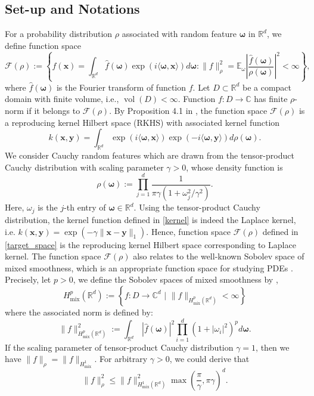 \documentclass[11pt,twoside]{article}
\theoremstyle{plain}
\theoremstyle{definition}
\theoremstyle{remark}
\newcommand{\R}{\mathbb{R}}
\newcommand{\C}{\mathbb{C}}
\newcommand{\E}{\mathbb{E}}
\newcommand{\xb}{\mathbf{x}}
\newcommand{\yb}{\mathbf{y}}
\newcommand{\Fc}{\mathcal{F}}
\newcommand{\vol}{\mathop{\mathrm{vol}}}
\newcommand{\omegab}{\boldsymbol\omega}
\begin{document}
\subsection{Set-up and Notations}
For a probability distribution $\rho$ associated with random feature $\omegab$ in $\R^d$, we define function space 
\begin{equation}
\label{target_space}
\Fc(\rho) := \left\{ f(\xb) = \int_{\R^d} \hat{f}(\omegab)\exp(i\langle \omegab, \xb\rangle)d\omegab : \|f\|^2_\rho = \E_\omega \left|\frac{\hat{f}(\omegab)}{\rho(\omegab)} \right|^2 <\infty \right\},
\end{equation}
where $\hat{f}(\omegab)$ is the Fourier transform of function $f$. Let $D\subset\R^d$ be a compact domain with finite volume, i.e., $\vol(D)<\infty$. 
Function $f:D\to\C$ has finite $\rho$-norm if it belongs to $\Fc(\rho)$. 
By Proposition 4.1 in \cite{Rahimi2008Uniform}, the function space $\Fc(\rho)$ is a reproducing kernel Hilbert space (RKHS) with associated kernel function
\begin{equation}
\label{kernel}
k(\xb,\yb) = \int_{\R^d} \exp(i\langle \omegab, \xb\rangle)\exp(-i\langle \omegab, \yb\rangle)d\rho(\omegab).
\end{equation}
We consider Cauchy random features which are drawn from the tensor-product Cauchy distribution with scaling parameter $\gamma>0$, whose density function is 
\begin{equation}
\rho(\omegab) := \prod_{j=1}^d \frac{1}{\pi\gamma(1+\omega_j^2/\gamma^2) }.
\end{equation}  
Here, $\omega_j$ is the $j$-th entry of $\omegab\in\R^d$. 
Using the tensor-product Cauchy distribution, the kernel function defined in \eqref{kernel} is indeed the Laplace kernel, i.e. $k(\xb,\yb) = \exp(-\gamma\|\xb-\yb\|_1)$. Hence, function space $\Fc(\rho)$ defined in \eqref{target_space} is the reproducing kernel Hilbert space corresponding to Laplace kernel.
The function space $\Fc(\rho)$ also relates to the well-known Sobolev space of mixed smoothness, which is an appropriate function space for studying PDEs \cite{brezis2011functional}.
Precisely, let $p>0$, we define the Sobolev spaces of mixed smoothness by \cite{potts2024anovaboostingrandomfourierfeatures},
$$H^p_{\text{mix}}(\mathbb{R}^d):= \left\{f:D\rightarrow \mathbb{C}^d \,\, \Big\rvert \,\, \|f\|_{H^p_{\text{mix}}(\mathbb{R}^d)}< \infty \right\}$$
where the associated norm is defined by:
\begin{equation*}
\|f\|^2_{H^p_{\text{mix}}(\mathbb{R}^d)}:=\int_{\mathbb{R}^d} \, |\hat{f}(\omegab)|^2 \prod_{i=1}^d \left(1+|\omega_i|^2\right)^p d\omegab.
\end{equation*}
If the scaling parameter of tensor-product Cauchy distribution $\gamma=1$, then we have $\|f\|_\rho = \|f\|_{H^1_{\text{mix}}}$. For arbitrary $\gamma>0$, we could derive that
\begin{equation*}
\|f\|_\rho^2 \leq \|f\|^2_{H^1_{\text{mix}}(\mathbb{R}^d)} \max\left(\frac{\pi}{\gamma}, \pi\gamma\right)^d.
\end{equation*}
\end{document}
